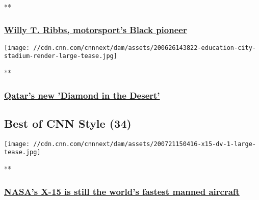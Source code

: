 **

\hypertarget{willy-t-ribbs-motorsports-black-pioneer}{%
\subsubsection{\texorpdfstring{\href{/videos/sports/2020/06/30/willy-t-ribbs-black-motorsport-pioneer-formula-one-nascar-indy500-spt-intl-lon-orig-cmd.cnn/video/playlists/international-sport-playlist-general-videos/}{Willy
T. Ribbs, motorsport's Black
pioneer}}{Willy T. Ribbs, motorsport's Black pioneer}}\label{willy-t-ribbs-motorsports-black-pioneer}}

\href{/videos/sports/2020/06/26/education-city-stadium-qatar-2022-diamond-desert-world-cup-football-spt-intl-lon-orig.cnn/video/playlists/international-sport-playlist-general-videos/}{}

\texttt{[image: //cdn.cnn.com/cnnnext/dam/assets/200626143822-education-city-stadium-render-large-tease.jpg]}

**

\hypertarget{qatars-new-diamond-in-the-desert}{%
\subsubsection{\texorpdfstring{\href{/videos/sports/2020/06/26/education-city-stadium-qatar-2022-diamond-desert-world-cup-football-spt-intl-lon-orig.cnn/video/playlists/international-sport-playlist-general-videos/}{Qatar's
new 'Diamond in the
Desert'}}{Qatar's new 'Diamond in the Desert'}}\label{qatars-new-diamond-in-the-desert}}

\hypertarget{best-of-cnn-style-34}{%
\subsection{Best of CNN Style (34)}\label{best-of-cnn-style-34}}

\href{/videos/design/2020/07/17/north-american-x15-mxb-lon-orig.cnn/video/playlists/cnn-style/}{}

\texttt{[image: //cdn.cnn.com/cnnnext/dam/assets/200721150416-x15-dv-1-large-tease.jpg]}

**

\hypertarget{nasas-x-15-is-still-the-worlds-fastest-manned-aircraft}{%
\subsubsection{\texorpdfstring{\href{/videos/design/2020/07/17/north-american-x15-mxb-lon-orig.cnn/video/playlists/cnn-style/}{NASA's
X-15 is still the world's fastest manned
aircraft}}{NASA's X-15 is still the world's fastest manned aircraft}}\label{nasas-x-15-is-still-the-worlds-fastest-manned-aircraft}}


